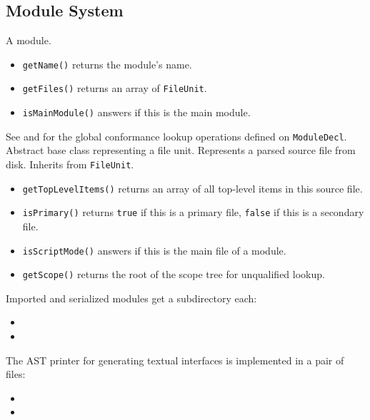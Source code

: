 \documentclass[../generics]{subfiles}
\begin{document}
\subsection*{Module System}
A module.
\begin{itemize}
\item \texttt{getName()} returns the module's name.
\item \texttt{getFiles()} returns an array of \texttt{FileUnit}.
\item \texttt{isMainModule()} answers if this is the main module.
\end{itemize}
See  and  for the global conformance lookup operations defined on \texttt{ModuleDecl}.
Abstract base class representing a file unit.
Represents a parsed source file from disk. Inherits from \texttt{FileUnit}.
\begin{itemize}
\item \texttt{getTopLevelItems()} returns an array of all top-level items in this source file.
\item \texttt{isPrimary()} returns \texttt{true} if this is a primary file, \texttt{false} if this is a secondary file.
\item \texttt{isScriptMode()} answers if this is the main file of a module.
\item \texttt{getScope()} returns the root of the scope tree for unqualified lookup.
\end{itemize}

Imported and serialized modules get a subdirectory each:
\begin{itemize}
\item {}
\item {}
\end{itemize}
The AST printer for generating textual interfaces is implemented in a pair of files:
\begin{itemize}
\item {}
\item {}
\end{itemize}
\end{document}
